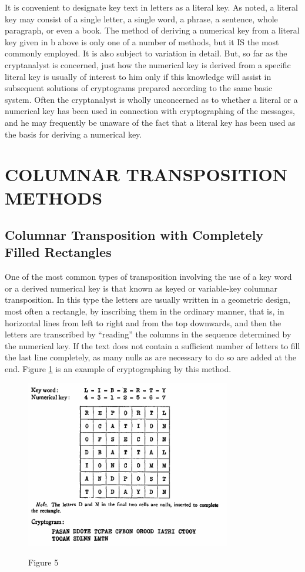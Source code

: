 \mypara It is convenient to designate key text in letters as a literal key. As
noted, a literal key may consist of a single letter, a single word, a phrase,
a sentence, whole paragraph, or even a book. The method of deriving
a numerical key from a literal key given in b above is only one of a number of methods, but it IS the most commonly employed. It is also subject to
variation in detail. But, so far as the cryptanalyst is concerned, just how
the numerical key is derived from a specific literal key is usually of
interest to him only if this knowledge will assist in subsequent solutions
of cryptograms prepared according to the same basic system. Often the
cryptanalyst is wholly unconcerned as to whether a literal or a numerical
key has been used in connection with cryptographing of the messages,
and he may frequently be unaware of the fact that a literal key has been
used as the basis for deriving a numerical key.

\section{COLUMNAR TRANSPOSITION METHODS}

\subsection{Columnar Transposition with Completely Filled Rectangles}

\mypara One of the most common types of transposition involving the use
of a key word or a derived numerical key is that known as keyed or
variable-key columnar transposition. In this type the letters are usually
written in a geometric design, most often a rectangle, by inscribing them
in the ordinary manner, that is, in horizontal lines from left to right and
from the top downwards, and then the letters are transcribed by
“reading” the columns in the sequence determined by the numerical key.
If the text does not contain a sufficient number of letters to fill the last
line completely, as many nulls as are necessary to do so are added at the
end. Figure \ref{fig:Figure 5} is an example of cryptographing by this method.

 
\begin{figure}[h]
  \centering
    \includegraphics[width=0.8\textwidth,natwidth=454,natheight=371]{Chapter2_Figure5.png}
    \label{fig:Figure 5}
    \caption{Figure 5}
\end{figure}


